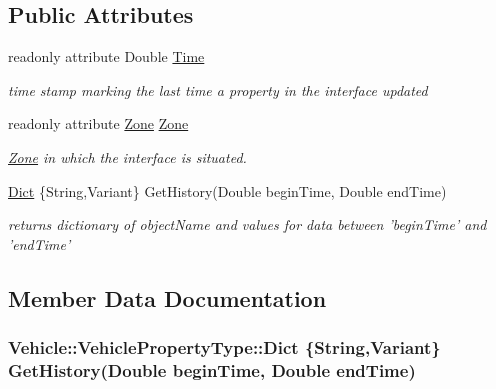 \subsection*{Public Attributes}
\begin{DoxyCompactItemize}
\item 
\hypertarget{interfaceVehicle_1_1VehiclePropertyType_a674573d2d34a4ef16067a81f2b007142}{readonly attribute Double \hyperlink{interfaceVehicle_1_1VehiclePropertyType_a674573d2d34a4ef16067a81f2b007142}{Time}}\label{interfaceVehicle_1_1VehiclePropertyType_a674573d2d34a4ef16067a81f2b007142}

\begin{DoxyCompactList}\small\item\em time stamp marking the last time a property in the interface updated \end{DoxyCompactList}\item 
\hypertarget{interfaceVehicle_1_1VehiclePropertyType_af45aaf95c44c014600a7451d8026a005}{readonly attribute \hyperlink{classZone}{Zone} \hyperlink{interfaceVehicle_1_1VehiclePropertyType_af45aaf95c44c014600a7451d8026a005}{Zone}}\label{interfaceVehicle_1_1VehiclePropertyType_af45aaf95c44c014600a7451d8026a005}

\begin{DoxyCompactList}\small\item\em \hyperlink{classZone}{Zone} in which the interface is situated. \end{DoxyCompactList}\item 
\hyperlink{interfaceVehicle_1_1VehiclePropertyType_aa05612a7c19b918bb4e444934b73cb4c}{Dict} \{String,Variant\} Get\-History(Double begin\-Time, Double end\-Time)
\begin{DoxyCompactList}\small\item\em returns dictionary of object\-Name and values for data between 'begin\-Time' and 'end\-Time' \end{DoxyCompactList}\end{DoxyCompactItemize}


\subsection{Member Data Documentation}
\hypertarget{interfaceVehicle_1_1VehiclePropertyType_aa05612a7c19b918bb4e444934b73cb4c}{
\subsubsection[{Dict}]{\setlength{\rightskip}{0pt plus 5cm}Vehicle\-::\-Vehicle\-Property\-Type\-::\-Dict \{String,Variant\} Get\-History(Double begin\-Time, Double end\-Time)}}\label{interfaceVehicle_1_1VehiclePropertyType_aa05612a7c19b918bb4e444934b73cb4c}


